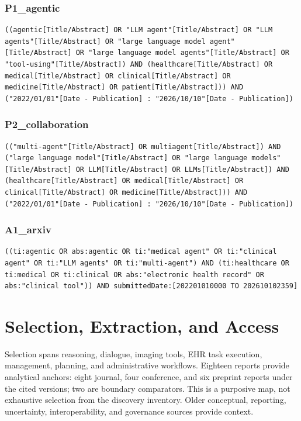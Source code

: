 \documentclass[journal,10pt]{IEEEtran}
\begin{document}
\subsubsection{P1\_agentic}
\begin{lstlisting}
((agentic[Title/Abstract] OR "LLM agent"[Title/Abstract] OR "LLM agents"[Title/Abstract] OR "large language model agent"[Title/Abstract] OR "large language model agents"[Title/Abstract] OR "tool-using"[Title/Abstract]) AND (healthcare[Title/Abstract] OR medical[Title/Abstract] OR clinical[Title/Abstract] OR medicine[Title/Abstract] OR patient[Title/Abstract])) AND ("2022/01/01"[Date - Publication] : "2026/10/10"[Date - Publication])
\end{lstlisting}
\subsubsection{P2\_collaboration}
\begin{lstlisting}
(("multi-agent"[Title/Abstract] OR multiagent[Title/Abstract]) AND ("large language model"[Title/Abstract] OR "large language models"[Title/Abstract] OR LLM[Title/Abstract] OR LLMs[Title/Abstract]) AND (healthcare[Title/Abstract] OR medical[Title/Abstract] OR clinical[Title/Abstract] OR medicine[Title/Abstract])) AND ("2022/01/01"[Date - Publication] : "2026/10/10"[Date - Publication])
\end{lstlisting}
\subsubsection{A1\_arxiv}
\begin{lstlisting}
((ti:agentic OR abs:agentic OR ti:"medical agent" OR ti:"clinical agent" OR ti:"LLM agents" OR ti:"multi-agent") AND (ti:healthcare OR ti:medical OR ti:clinical OR abs:"electronic health record" OR abs:"clinical tool")) AND submittedDate:[202201010000 TO 202610102359]
\end{lstlisting}
\section{Selection, Extraction, and Access}
Selection spans reasoning, dialogue, imaging tools, EHR task execution, management, planning, and administrative workflows. Eighteen reports provide analytical anchors: eight journal, four conference, and six preprint reports under the cited versions; two are boundary comparators. This is a purposive map, not exhaustive selection from the discovery inventory. Older conceptual, reporting, uncertainty, interoperability, and governance sources provide context.
\end{document}
